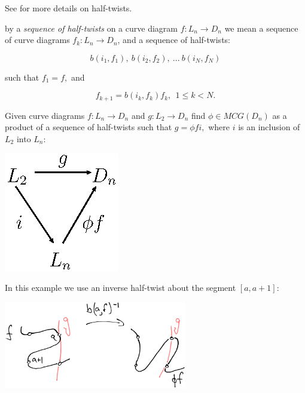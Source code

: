 \documentclass[12pt,a4paper]{article}
\begin{document}
See \cite{Kassel10} for more details on half-twists.

 by a {\it sequence of half-twists} on a curve
diagram $f:L_n\to D_n$ we mean a
sequence of curve diagrams $f_k: L_n\to D_n$, and a sequence of half-twists:

        $$ b(i_1, f_1),\ b(i_2, f_2),\ ...\ b(i_N, f_N) $$

such that $f_1=f,$ and

        $$ f_{k+1} = b(i_k, f_k) f_k,\ \  \text{} 1\leq k<N.$$




Given curve diagrams $f:L_n\to D_n$ and $g:L_2\to D_n$
find $\phi\in MCG(D_n)$ as a product of
a sequence of half-twists such that %
$g = \phi f i,$ where $i$ is an inclusion of $L_2$ into $L_n:$

\begin{center}
\includegraphics{halftwist-factor.eps}
\end{center}


In this example we use an inverse half-twist about the segment $[a, a+1]:$

\begin{center}
\includegraphics[width=0.6\textwidth]{example-problem-1.eps}
\end{center}
\end{document}
